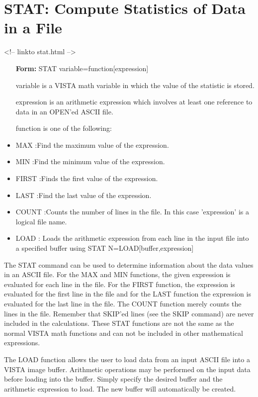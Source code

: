 \section{STAT: Compute Statistics of Data in a File}
\begin{rawhtml}
<!-- linkto stat.html -->
\end{rawhtml}
\begin{itemize}
  \item[\textbf{Form: } STAT variable=function{[expression]}\hfill]{}
  \item[variable]{is a VISTA math variable in which the
       value of the statistic is stored.}
  \item[expression]{is an arithmetic expression which involves
       at least one reference to data in an OPEN'ed ASCII file.}
  \item[function]{is one of the following:}
  \item{MAX :Find the maximum value of the expression.}
  \item{MIN :Find the minimum value of the expression.}
  \item{FIRST :Finds the first value of the expression.}
  \item{LAST :Find the last value of the expression.}
  \item{COUNT :Counts the number of lines in the file.
        In this case 'expression' is a logical file name.}
  \item{LOAD   :  Loads the arithmetic expression from each
       line in the input file into a specified buffer
       using STAT N=LOAD{[buffer,expression]}}
\end{itemize}

The STAT command can be used to determine information about the data values
in an ASCII file.  For the MAX and MIN functions, the given expression is
evaluated for each line in the file.  For the FIRST function, the
expression is evaluated for the first line in the file and for the LAST
function the expression is evaluated for the last line in the file.  The
COUNT function merely counts the lines in the file. Remember that SKIP'ed
lines (see the SKIP command) are never included in the calculations.  These
STAT functions are not the same as the normal VISTA math functions and can
not be included in other mathematical expressions.

The LOAD function allows the user to load data from an input ASCII file
into a VISTA image buffer. Arithmetic operations may be performed on the
input data before loading into the buffer. Simply specify the desired
buffer and the arithmetic expression to load. The new buffer will
automatically be created.

